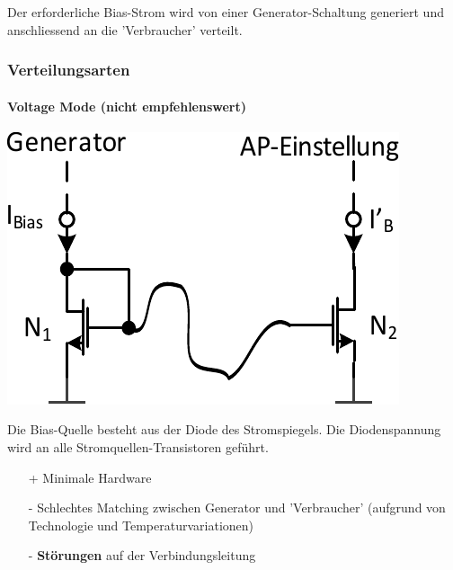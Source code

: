 \smallskip

Der erforderliche Bias-Strom wird von einer Generator-Schaltung generiert und anschliessend an die 'Verbraucher' verteilt. 


\subsubsection{Verteilungsarten}
\paragraph{Voltage Mode (nicht empfehlenswert)}

\begin{minipage}[t]{0.4\columnwidth}
    \includegraphics[width=\columnwidth, align=t]{images/13_voltage_mode.pdf}
\end{minipage}
\hfill
\begin{minipage}[t]{0.58\columnwidth}
    \raggedright
    Die Bias-Quelle besteht aus der Diode des Stromspiegels.
    Die Diodenspannung wird an alle Stromquellen-Transistoren geführt.

    \smallskip

    \begin{itemize}
        \item[+] Minimale Hardware
        \item[-] Schlechtes Matching zwischen Generator und 'Verbraucher' (aufgrund von Technologie und Temperaturvariationen)
        \item[-] \textbf{Störungen} auf der Verbindungsleitung
    \end{itemize}
\end{minipage}




